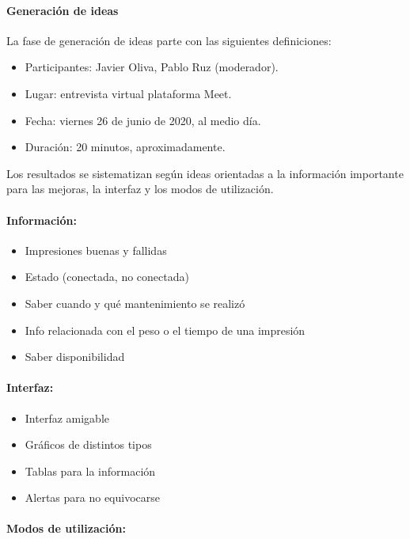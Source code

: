 \paragraph{Generación de ideas} La fase de generación de ideas parte con las siguientes definiciones:

\begin{itemize}
\item Participantes: Javier Oliva, Pablo Ruz (moderador).
\item Lugar: entrevista virtual plataforma Meet.
\item Fecha: viernes 26 de junio de 2020, al medio día.
\item Duración: 20 minutos, aproximadamente.
\end{itemize}

Los resultados se sistematizan según ideas orientadas a la información importante para las mejoras, la interfaz y los modos de utilización.

\paragraph{Información:}
\begin{itemize}
\item Impresiones buenas y fallidas
\item Estado (conectada, no conectada)
\item Saber cuando y qué mantenimiento se realizó
\item Info relacionada con el peso o el tiempo de una impresión
\item Saber disponibilidad

\end{itemize}

\paragraph{Interfaz:}
\begin{itemize}
\item Interfaz amigable
\item Gráficos de distintos tipos
\item Tablas para la información
\item Alertas para no equivocarse

\end{itemize}

\paragraph{Modos de utilización:}

